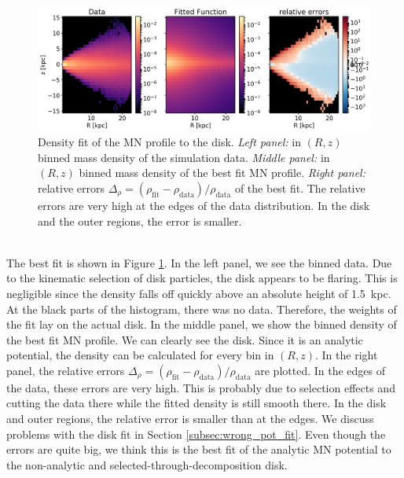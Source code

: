 \begin{figure}[htbp]
\captionsetup{format=plain}
    \centering
    \includegraphics[width = \textwidth]{plots/Auriga/MND_best_fit_snap_127.png}
    \caption{Density fit of the \ac{MN} profile to the disk. \textit{Left panel:} in $(R,z)$ binned mass density of the simulation data. \textit{Middle panel:} in $(R,z)$ binned mass density of the best fit \ac{MN} profile. \textit{Right panel:} relative errors \(\Delta_\rho = (\rho_{\mathrm{fit}}- \rho_{\mathrm{data}})/\rho_{\mathrm{data}}\) of the best fit. The relative errors are very high at the edges of the data distribution. In the disk and the outer regions, the error is smaller. }
    \label{fig:MND}
\end{figure}
\\The best fit is shown in Figure \ref{fig:MND}. In the left panel, we see the binned data. Due to the kinematic selection of disk particles, the disk appears to be flaring. This is negligible since the density falls off quickly above an absolute height of \SI{1.5}{kpc}. At the black parts of the histogram, there was no data. Therefore, the weights of the fit lay on the actual disk. In the middle panel, we show the binned density of the best fit \ac{MN} profile. We can clearly see the disk. Since it is an analytic potential, the density can be calculated for every bin in $(R, z)$. In the right panel, the relative errors \(\Delta_\rho = (\rho_{\mathrm{fit}}- \rho_{\mathrm{data}})/\rho_{\mathrm{data}}\) are plotted. In the edges of the data, these errors are very high. This is probably due to selection effects and cutting the data there while the fitted density is still smooth there. In the disk and outer regions, the relative error is smaller than at the edges. We discuss problems with the disk fit in Section \ref{subsec:wrong_pot_fit}. Even though the errors are quite big, we think this is the best fit of the analytic \ac{MN} potential to the non-analytic and selected-through-decomposition disk. 


